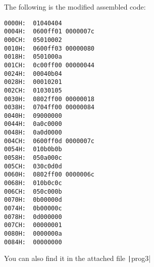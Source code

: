\documentclass[answers]{exam}
\begin{document}
\begin{questions}
    \begin{solution}
        The following is the modified assembled code:
        \begin{verbatim}
0000H:  01040404
0004H:  0600ff01 0000007c
000CH:  05010002
0010H:  0600ff03 00000080
0018H:  0501000a
001CH:  0c00ff00 00000044
0024H:  00040b04
0028H:  00010201
002CH:  01030105
0030H:  0802ff00 00000018
0038H:  0704ff00 00000084
0040H:  09000000
0044H:  0a0c0000
0048H:  0a0d0000
004CH:  0600ff0d 0000007c
0054H:  010b0b0b
0058H:  050a000c
005CH:  030c0d0d
0060H:  0802ff00 0000006c
0068H:  010b0c0c
006CH:  050c000b
0070H:  0b00000d
0074H:  0b00000c
0078H:  0d000000
007CH:  00000001
0080H:  0000000a
0084H:  00000000
        \end{verbatim}
        You can also find it in the attached file \texttt|prog3|
    \end{solution}

\end{questions}
\end{document}
